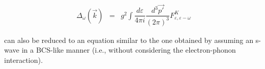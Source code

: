 \documentclass[uplatex,a4j,12pt,dvipdfmx]{jsarticle}
\begin{document}
\begin{eqnarray}
	\Delta_{\omega}^{} (\vec{k})
	&=&
	g^{2}
	\int \!\! \dfrac{d \varepsilon}{4 \pi i} \dfrac{d^{3} \vec{p'}}{ (2 \pi)^{3}}
	F^{K}_{\varepsilon , \varepsilon - \omega}
\end{eqnarray}

can also be reduced to an equation similar to the one obtained by assuming an s-wave in a BCS-like manner (i.e., without considering the electron-phonon interaction).
\end{document}

